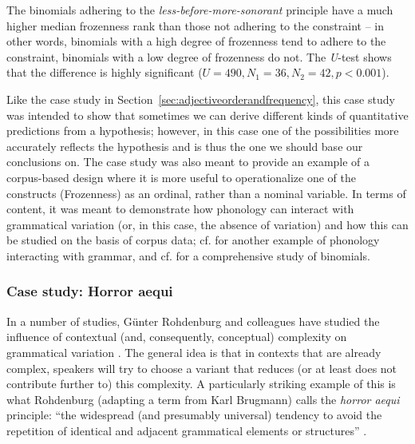 \hspace*{-0.66089pt}The binomials  adhering to the \textit{less\hyp{}before\hyp{}more\hyp{}sonorant}  principle have a much higher median  frozenness  rank than those not adhering to the constraint -- in other words, binomials with a high degree of frozenness tend to adhere to the constraint, binomials  with a low degree of frozenness do not. The \textit{U}\hyp{}test shows that the difference is highly significant ($U = 490, N_1 = 36, N_2 = 42, p < 0.001$).

Like the case study in Section~\ref{sec:adjectiveorderandfrequency}, this case study was intended to show that sometimes we can derive different kinds of quantitative  predictions from a hypothesis; however, in this case one of the possibilities more accurately reflects the hypothesis and is thus the one we should base our conclusions on. The case study was also meant to provide an example of a corpus\hyp{}based design  where it is more useful to operationalize  one of the constructs (Frozenness)  as an ordinal,  rather than a nominal  variable. In terms of content, it was meant to demonstrate how phonology can interact with grammatical  variation  (or, in this case, the absence of variation) and how this can be studied on the basis of corpus data; cf. \citet{rohdenburg_phonological_2003} for another example of phonology interacting with grammar, and cf. \citet{lohmann_constituent_2013} for a comprehensive study of  binomials.

\subsubsection{Case study: Horror aequi}
\label{sec:horroraequi}

In a number of studies, G\"{u}nter Rohdenburg and colleagues have studied the influence of contextual (and, consequently, conceptual) complexity  on grammatical  variation  \citep[e.g.][]{rohdenburg_replacement_1995, rohdenburg_cognitive_2003}. The general idea is that in contexts that are already complex, speakers will try to choose a variant that reduces (or at least does not contribute further to) this complexity.  A particularly striking example of this is what Rohdenburg (adapting a term from Karl Brugmann) calls the \textit{horror aequi}  principle: ``the widespread (and presumably universal) tendency to avoid the repetition of identical and adjacent grammatical  elements or structures'' \citep[206]{rohdenburg_cognitive_2003}.

